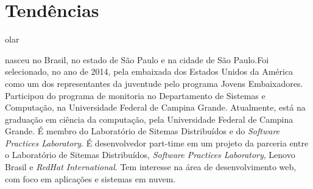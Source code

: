 \documentclass{classe_cn}                 %
\begin{document}
\section{Tendências}

olar



\vspace{1.0cm}
 nasceu no Brasil, no estado de São Paulo e na cidade de São Paulo.Foi selecionado, no ano de 2014, pela embaixada dos Estados Unidos da América como um dos representantes da juventude pelo programa Jovens Embaixadores. Participou do programa de monitoria no Departamento de Sistemas e Computação, na Universidade Federal de Campina Grande. Atualmente, está na graduação em ciência da computação, pela Universidade Federal de Campina Grande. É membro do Laboratório de Sitemas Distribuídos e do \textit{Software Practices Laboratory}. É desenvolvedor part-time em um projeto da parceria entre o Laboratório de Sitemas Distribuídos, \textit{Software Practices Laboratory}, Lenovo Brasil e \textit{RedHat International}. Tem interesse na área de desenvolvimento web, com foco em aplicações e sistemas em nuvem.




\end{document}
